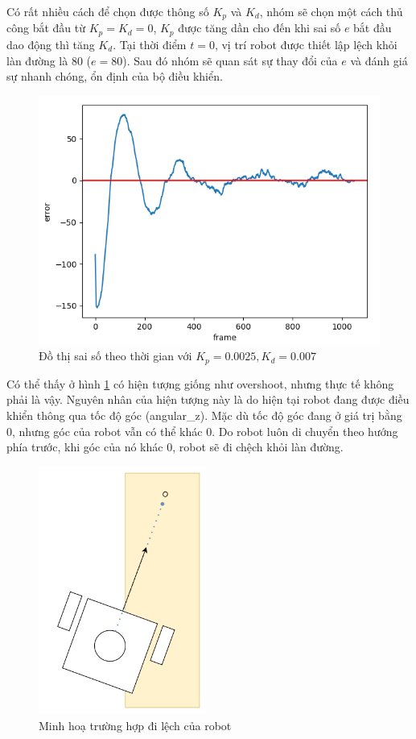 \noindent Có rất nhiều cách để chọn được thông số $K_p$ và $K_d$, nhóm sẽ chọn một cách thủ công bắt đầu từ $K_p = K_d = 0$, $K_p$ được tăng dần cho đến khi sai số $e$ bắt đầu dao động thì tăng $K_d$. Tại thời điểm $t = 0$, vị trí robot được thiết lập lệch khỏi làn đường là 80 ($e = 80$). Sau đó nhóm sẽ quan sát sự thay đổi của $e$ và đánh giá sự nhanh chóng, ổn định của bộ điều khiển.
\newpage
\begin{figure}[!hbt]
\begin{center}
    \includegraphics[width=12cm]{img/4_Implement/lane_keeping/error_plot.png}
    \caption{\label{pid_error_plot} Đồ thị sai số theo thời gian với $K_p = 0.0025, K_d = 0.007$}
\end{center}
\end{figure}
\noindent Có thể thấy ở hình \ref{pid_error_plot} có hiện tượng giống như overshoot, nhưng thực tế không phải là vậy. Nguyên nhân của hiện tượng này là do hiện tại robot đang được điều khiển thông qua tốc độ góc (angular\_z). Mặc dù tốc độ góc đang ở giá trị bằng 0, nhưng góc của robot vẫn có thể khác 0. Do robot luôn di chuyển theo hướng phía trước, khi góc của nó khác 0, robot sẽ đi chệch khỏi làn đường.
\begin{figure}[!hbt]
    \centering
    \includegraphics[width=5.5cm]{img/4_Implement/lane_keeping/error_view.png}
    \caption{Minh hoạ trường hợp đi lệch của robot}
\end{figure}